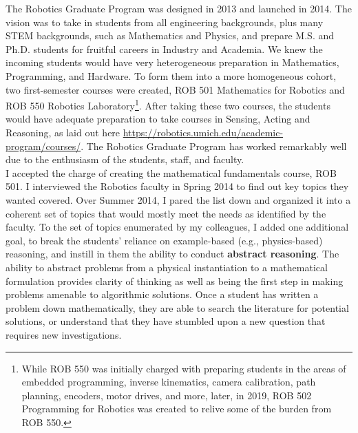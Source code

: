 
The Robotics Graduate Program was designed in 2013 and launched in 2014. The vision was to take in students from all engineering backgrounds, plus many STEM backgrounds, such as Mathematics and Physics, and prepare M.S. and Ph.D. students for fruitful careers in Industry and Academia. We knew the incoming students would have very heterogeneous preparation in Mathematics, Programming, and Hardware. To form them into a more homogeneous cohort, two first-semester courses were created, ROB 501 Mathematics for Robotics and ROB 550 Robotics Laboratory\footnote{While ROB 550 was initially charged with preparing students in the areas of embedded programming, inverse kinematics, camera calibration, path planning, encoders, motor drives, and more, later, in 2019, ROB 502 Programming for Robotics was created to relive some of the burden from ROB 550.}. After taking these two courses, the students would have adequate preparation to take courses in Sensing, Acting and Reasoning, as laid out here \url{https://robotics.umich.edu/academic-program/courses/}. The Robotics Graduate Program has worked remarkably well due to the enthusiasm of the students, staff, and faculty. \\

I accepted the charge of creating the mathematical fundamentals course, ROB 501. I interviewed the Robotics faculty in Spring 2014 to find out key topics they wanted covered. Over Summer 2014, I pared the list down and organized it into a coherent set of topics that would mostly meet the needs as identified by the faculty. To the set of topics enumerated by my colleagues, I added one additional goal, to break the students' reliance on example-based (e.g., physics-based) reasoning, and instill in them the ability to conduct \textbf{abstract reasoning}. The ability to abstract problems from a physical instantiation to a mathematical formulation provides clarity of thinking as well as being the first step in making problems amenable to algorithmic solutions. Once a student has written a problem down mathematically, they are able to search the literature for potential solutions, or understand that they have stumbled upon a new question that requires new investigations. \\

